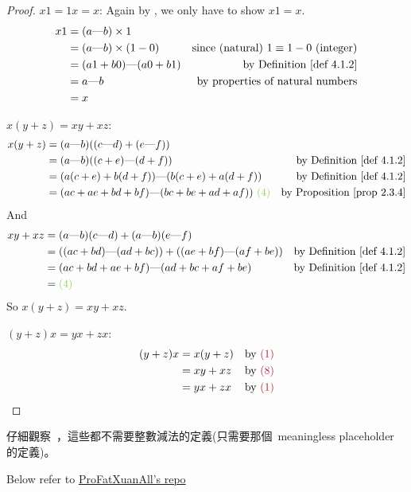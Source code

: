\begin{proof}
 \(x1 = 1x = x\):
Again by , we only have to show \(x1 = x\).
\begin{align*}
    x1 & = (a \M b) \X 1 \\
       & = (a \M b) \X (1 - 0) & \text{since (natural) \(1 \equiv 1 - 0\) (integer)} \\
       & = (a1 + b0) \M (a0 + b1) & \text{by \DEF{4.1.2}} \\
       & = a \M b & \text{by properties of natural numbers} \\
       & = x
\end{align*}

 \(x(y + z) = xy + xz\):
\begin{align*}
    x(y + z) & = (a \M b)((c \M d) + (e \M f)) \\
             & = (a \M b)((c + e) \M (d + f)) & \text{by \DEF{4.1.2}} \\
             & = (a(c + e) + b(d + f)) \M (b(c + e) + a(d + f)) & \text{by \DEF{4.1.2}} \\
             & = (ac + ae + bd + bf) \M (bc + be + ad + af)) \text{ \GREEN{(4)}} & \text{by \PROP{2.3.4}}
\end{align*}
And
\begin{align*}
    xy + xz & = (a \M b)(c \M d) + (a \M b)(e \M f) \\
            & = ((ac + bd) \M (ad + bc)) + ((ae + bf) \M (af + be)) & \text{by \DEF{4.1.2}} \\
            & = (ac + bd + ae + bf) \M (ad + bc + af + be) & \text{by \DEF{4.1.2}} \\
            & = \GREEN{(4)}
\end{align*}
So \(x(y + z) = xy + xz\).

 \((y + z)x = yx + zx\):
\begin{align*}
    (y + z)x & = x(y + z) & \text{by \MAROON{(1)}} \\
             & = xy + xz & \text{by \MAROON{(8)}} \\
             & = yx + zx & \text{by \MAROON{(1)}}
\end{align*}
\end{proof}

\begin{note}
仔細觀察\ ，這些都不需要整數減法的定義(只需要那個\  meaningless placeholder 的定義)。
\end{note}

\begin{note}
Below refer to \href{https://github.com/ProFatXuanAll/terence-tao-analysis/blob/33a8568dce2474f82e381dcb1309f9ce685ce2f9/Analysis-I/4-1-the-integers.tex#L320-L358}{ProFatXuanAll's repo}
\end{note}

